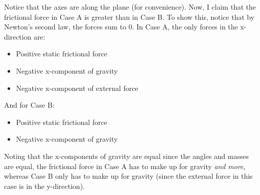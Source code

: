 \documentclass[11pt]{scrartcl}
\begin{document}
\begin{soln}
\begin{center}
  \end{center}
  Notice that the axes are along the plane (for convenience). Now, I claim that
  the frictional force in Case A is greater than in Case B. To show this, notice that by Newton's
  second law, the forces sum to $0$. In Case A, the only forces in the x-direction are:
  \begin{itemize}
    \item Positive static frictional force
    \item Negative x-component of gravity
    \item Negative x-component of external force
  \end{itemize}
  And for Case B:
  \begin{itemize}
    \item Positive static frictional force
    \item Negative x-component of gravity
  \end{itemize}
  Noting that the x-components of gravity are equal since the angles and masses are equal,
  the frictional force in Case A has to make up for gravity \textit{and more}, whereas
  Case B only has to make up for gravity (since the external force in this case is in the y-direction).
\end{soln}
\end{document}
